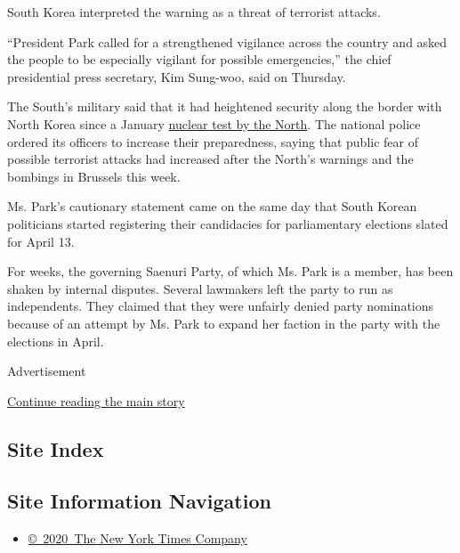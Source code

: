 South Korea interpreted the warning as a threat of terrorist attacks.

``President Park called for a strengthened vigilance across the country
and asked the people to be especially vigilant for possible
emergencies,'' the chief presidential press secretary, Kim Sung-woo,
said on Thursday.

The South's military said that it had heightened security along the
border with North Korea since a January
\href{http://www.nytimes.com/2016/01/06/world/asia/north-korea-hydrogen-bomb-test.html}{nuclear
test by the North}. The national police ordered its officers to increase
their preparedness, saying that public fear of possible terrorist
attacks had increased after the North's warnings and the bombings in
Brussels this week.

Ms. Park's cautionary statement came on the same day that South Korean
politicians started registering their candidacies for parliamentary
elections slated for April 13.

For weeks, the governing Saenuri Party, of which Ms. Park is a member,
has been shaken by internal disputes. Several lawmakers left the party
to run as independents. They claimed that they were unfairly denied
party nominations because of an attempt by Ms. Park to expand her
faction in the party with the elections in April.

Advertisement

\protect\hyperlink{after-bottom}{Continue reading the main story}

\hypertarget{site-index}{%
\subsection{Site Index}\label{site-index}}

\hypertarget{site-information-navigation}{%
\subsection{Site Information
Navigation}\label{site-information-navigation}}

\begin{itemize}
\tightlist
\item
  \href{https://help.nytimes.com/hc/en-us/articles/115014792127-Copyright-notice}{©~2020~The
  New York Times Company}
\end{itemize}

